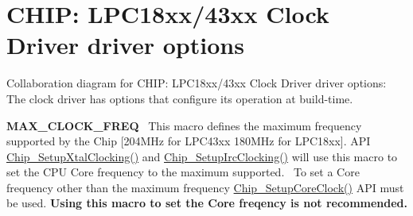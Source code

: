 \hypertarget{group___c_l_o_c_k__18_x_x__43_x_x___o_p_t_i_o_n_s}{}\section{C\+H\+IP\+: L\+P\+C18xx/43xx Clock Driver driver options}
\label{group___c_l_o_c_k__18_x_x__43_x_x___o_p_t_i_o_n_s}
Collaboration diagram for C\+H\+IP\+: L\+P\+C18xx/43xx Clock Driver driver options\+:
The clock driver has options that configure it\textquotesingle{}s operation at build-\/time.~\newline


{\bfseries M\+A\+X\+\_\+\+C\+L\+O\+C\+K\+\_\+\+F\+R\+EQ}~\newline
 This macro defines the maximum frequency supported by the Chip \mbox{[}204\+M\+Hz for L\+P\+C43xx 180\+M\+Hz for L\+P\+C18xx\mbox{]}. A\+PI \hyperlink{group___s_u_p_p_o_r_t__18_x_x__43_x_x___f_u_n_c_ga18737e4a022570724c77c5cdea9c0258}{Chip\+\_\+\+Setup\+Xtal\+Clocking()} and \hyperlink{group___s_u_p_p_o_r_t__18_x_x__43_x_x___f_u_n_c_ga6eff97a8da15798119eada6c5f000404}{Chip\+\_\+\+Setup\+Irc\+Clocking()} will use this macro to set the C\+PU Core frequency to the maximum supported.~\newline
 To set a Core frequency other than the maximum frequency \hyperlink{group___s_u_p_p_o_r_t__18_x_x__43_x_x___f_u_n_c_ga54251628aeac543524d98d4db12c39f9}{Chip\+\_\+\+Setup\+Core\+Clock()} A\+PI must be used. {\bfseries Using this macro to set the Core freqency is not recommended.} 